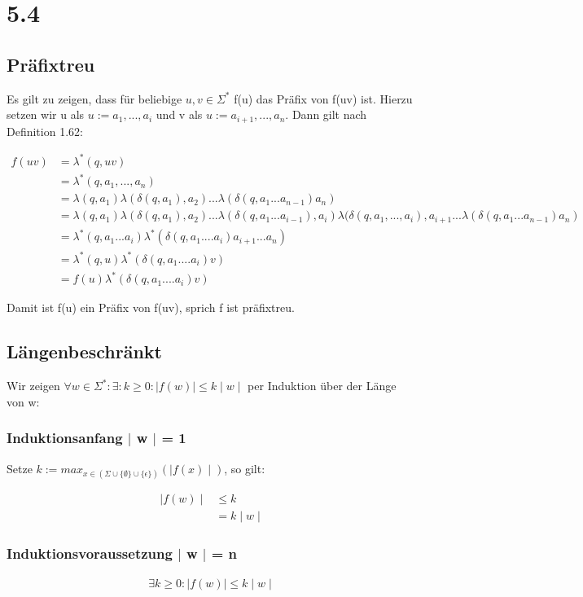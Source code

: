 \documentclass[12pt, a4paper]{article}
\begin{document}
\section*{5.4}

\subsection*{Präfixtreu}
Es gilt zu zeigen, dass für beliebige $u,v \in \Sigma^*$ f(u) das Präfix von f(uv) ist. Hierzu setzen wir u als $u := a_1,...,a_i$ und v als $u := a_{i+1},...,a_n$. Dann gilt nach Definition 1.62:

\begin{align*}
f(uv) &= \lambda^*(q,uv) \\
&= \lambda^*(q, a_1,...,a_n) \\
&= \lambda(q,a_1) \lambda(\delta(q, a_1), a_2) ... \lambda(\delta(q,a_1...a_{n-1})a_n) \\
&= \lambda(q,a_1) \lambda(\delta(q, a_1), a_2) ... \lambda(\delta(q, a_1 ... a_{i-1}), a_i) \lambda(\delta(q, a_1,..., a_i), a_{i+1} ...  \lambda(\delta(q,a_1...a_{n-1})a_n) \\
&= \lambda^*(q,a_1 ... a_i) \lambda^*(\delta(q, a_1 .... a_i) a_{i+1} ... a_n) \\
&= \lambda^*(q,u) \lambda^*(\delta(q, a_1 .... a_i) v)\\
&= f(u) \lambda^*(\delta(q, a_1 .... a_i) v)
\end{align*}

Damit ist f(u) ein Präfix von f(uv), sprich f ist präfixtreu.

\subsection*{Längenbeschränkt}
Wir zeigen $\forall w \in \Sigma^*: \exists: k \ge 0: \mid f(w) \mid \le k \mid w \mid $ per Induktion über der Länge von w:

\subsubsection*{Induktionsanfang $\mid$ w $\mid$ = 1}
Setze $k := max_{x \in (\Sigma \cup \{ \emptyset \} \cup \{ \epsilon \})}( \mid f(x) \mid)$, so gilt:

\begin{align*}
\mid f(w) \mid &\le k \\
&= k \mid w \mid
\end{align*}

\subsubsection*{Induktionsvoraussetzung $\mid$ w $\mid$ = n}
\begin{align*}
\exists k \ge 0: \mid f(w) \mid \le k \mid w \mid
\end{align*}
\end{document}
